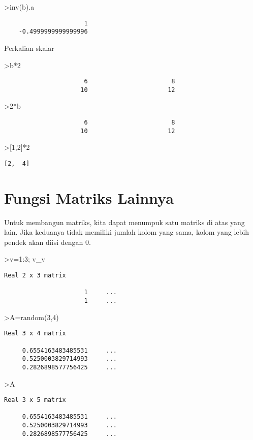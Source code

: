 \documentclass[
]{book}
\begin{document}
\textgreater inv(b).a

\begin{verbatim}
                      1 
    -0.4999999999999996 
\end{verbatim}

Perkalian skalar

\textgreater b*2

\begin{verbatim}
                      6                       8 
                     10                      12 
\end{verbatim}

\textgreater2*b

\begin{verbatim}
                      6                       8 
                     10                      12 
\end{verbatim}

\textgreater{[}1,2{]}*2

\begin{verbatim}
[2,  4]
\end{verbatim}

\chapter{Fungsi Matriks Lainnya}\label{fungsi-matriks-lainnya}

Untuk membangun matriks, kita dapat menumpuk satu matriks di atas yang lain. Jika keduanya tidak memiliki jumlah kolom yang sama, kolom yang lebih pendek akan diisi dengan 0.

\textgreater v=1:3; v\_v

\begin{verbatim}
Real 2 x 3 matrix

                      1     ...
                      1     ...
\end{verbatim}

\textgreater A=random(3,4)

\begin{verbatim}
Real 3 x 4 matrix

     0.6554163483485531     ...
     0.5250003829714993     ...
     0.2826898577756425     ...
\end{verbatim}

\textgreater A

\begin{verbatim}
Real 3 x 5 matrix

     0.6554163483485531     ...
     0.5250003829714993     ...
     0.2826898577756425     ...
\end{verbatim}
\end{document}
